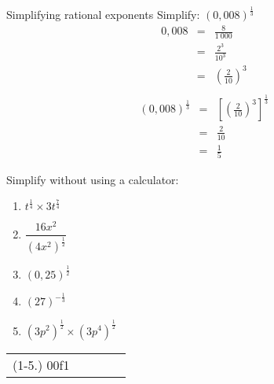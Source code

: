 \begin{wex}
{Simplifying rational exponents} 
{Simplify: $(0,008)^{\frac{1}{3}}$}
{
\begin{eqnarray*}
 0,008 & = & \frac{8}{1~000} \\
       & = & \frac{2^3}{10^3} \\
       & = & \left(\frac{2}{10}\right)^3\\
\end{eqnarray*}
\begin{eqnarray*}
 (0,008)^{\frac{1}{3}} & = & \left[\left(\frac{2}{10}\right)^3\right]^{\frac{1}{3}} \\
		 & = & \frac{2}{10} \\
		 & = & \frac{1}{5}
\end{eqnarray*}
}
\end{wex}

\begin{exercises}{}{Simplify without using a calculator:
\begin{multicols}{2}
\begin{enumerate}[label=\textbf{\arabic*}., itemsep=5pt]
 \item $ t^{\frac{1}{4}} \times 3t^{\frac{7}{4}} $
 \item $ \dfrac{16x^2}{(4x^2)^{\frac{1}{2}}} $
 \item $ (0,25)^{\frac{1}{2}} $
 \item $ (27)^{-\frac{1}{3}} $
 \item $ (3p^2)^{\frac{1}{2}} \times (3p^4)^{\frac{1}{2}} $
\end{enumerate}
\end{multicols}
\practiceinfo
\par 
\begin{tabular}[h]{ccccc}
(1-5.) 00f1\end{tabular}
}
\end{exercises}




